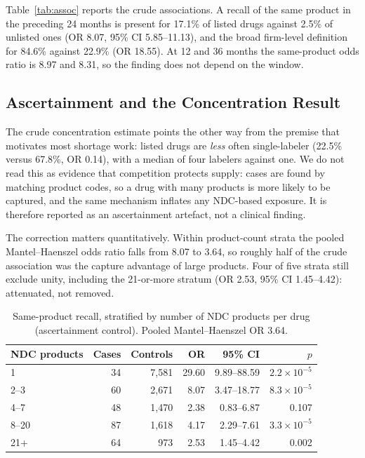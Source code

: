 \documentclass[conference,letterpaper]{IEEEtran}
\begin{document}
Table~\ref{tab:assoc} reports the crude associations. A recall of the same
product in the preceding 24 months is present for 17.1\% of listed drugs against
2.5\% of unlisted ones (OR 8.07, 95\% CI 5.85--11.13), and the broad firm-level
definition for 84.6\% against 22.9\% (OR 18.55). At 12 and 36 months the
same-product odds ratio is 8.97 and 8.31, so the finding does not depend on the
window.

\subsection{Ascertainment and the Concentration Result}
The crude concentration estimate points the other way from the premise that
motivates most shortage work: listed drugs are \emph{less} often single-labeler
(22.5\% versus 67.8\%, OR 0.14), with a median of four labelers against one. We
do not read this as evidence that competition protects supply: cases are found by
matching product codes, so a drug with many products is more likely to be
captured, and the same mechanism inflates any NDC-based exposure. It is therefore
reported as an ascertainment artefact, not a clinical finding.

The correction matters quantitatively. Within product-count strata the pooled
Mantel--Haenszel odds ratio falls from 8.07 to 3.64, so roughly half of the crude
association was the capture advantage of large products. Four of five strata
still exclude unity, including the 21-or-more stratum (OR 2.53, 95\% CI
1.45--4.42): attenuated, not removed.

\begin{table}[t]
\caption{Same-product recall, stratified by number of NDC products per drug
(ascertainment control). Pooled Mantel--Haenszel OR 3.64.}
\label{tab:strata}
\centering
\footnotesize
\setlength{\tabcolsep}{1.6pt}
\begin{tabular}{@{}lrrrrr@{}}
\hline
NDC products & Cases & Controls & OR & 95\% CI & $p$\\
\hline
1 & 34 & 7{,}581 & 29.60 & 9.89--88.59 & $2.2\!\times\!10^{-5}$\\
2--3 & 60 & 2{,}671 & 8.07 & 3.47--18.77 & $8.3\!\times\!10^{-5}$\\
4--7 & 48 & 1{,}470 & 2.38 & 0.83--6.87 & 0.107\\
8--20 & 87 & 1{,}618 & 4.17 & 2.29--7.61 & $3.3\!\times\!10^{-5}$\\
21+ & 64 & 973 & 2.53 & 1.45--4.42 & 0.002\\
\hline
\end{tabular}
\end{table}
\end{document}

